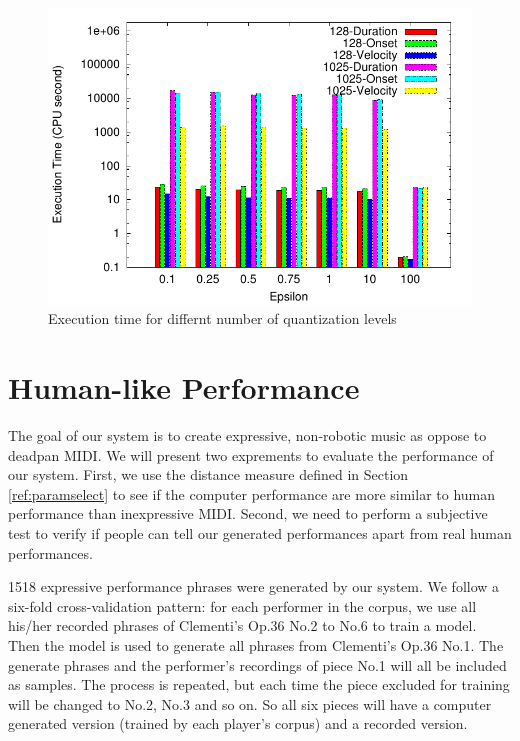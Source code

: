 \begin{figure}[tp]
   \begin{center}
      \includegraphics[width=\textwidth]{fig/quant_comp}
   \end{center}
   \caption{Execution time for differnt number of quantization levels}
   \label{fig:quant_comp}
\end{figure}

\section{Human-like Performance}
\label{sec:turing}
The goal of our system is to create expressive, non-robotic music as oppose to deadpan MIDI. We will present two exprements to evaluate the performance of our system. First, we use the distance measure defined in Section \ref{ref:paramselect} to see if the computer performance are more similar to human performance than inexpressive MIDI. Second, we need to perform a subjective test to verify if people can tell our generated performances apart from real human performances.

1518 expressive performance phrases were generated by our system. We follow a six-fold cross-validation pattern: for each performer in the corpus, we use all his/her recorded phrases of Clementi's Op.36 No.2 to No.6 to train a model. Then the model is used to generate all phrases from Clementi's Op.36 No.1. The generate phrases and the performer's recordings of piece No.1 will all be included as samples. The process is repeated, but each time the piece excluded for training will be changed to No.2, No.3 and so on. So all six pieces will have a computer generated version (trained by each player's corpus) and a recorded version.

